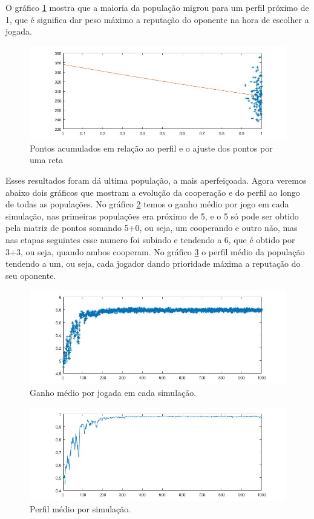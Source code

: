 O gráfico \ref{fig16} mostra que a maioria da população migrou para um perfil próximo de 1, que é significa dar peso máximo a reputação do oponente na hora de escolher a jogada.

\begin{figure}[H]
\centering
\includegraphics[width=14cm]{graf16.jpg}
\caption{Pontos acumulados em relação ao perfil e o ajuste dos pontos por uma reta}
\label{fig16}
\end{figure}

Esses resultados foram dá ultima população, a mais aperfeiçoada. Agora veremos abaixo dois gráficos que mostram a evolução da cooperação e do perfil ao longo de todas as populações. No gráfico \ref{fig17} temos o ganho médio por jogo em cada simulação, nas primeiras populações era próximo de 5, e o 5 só pode ser obtido pela matriz de pontos somando 5+0, ou seja, um cooperando e outro não, mas nas etapas seguintes esse numero foi subindo e tendendo a 6, que é obtido por 3+3, ou seja, quando ambos cooperam. No gráfico \ref{fig18} o perfil médio da população tendendo a um, ou seja, cada jogador dando prioridade máxima a reputação do seu oponente.

\begin{figure}[H]
\centering
\includegraphics[width=14cm]{graf17.jpg}
\caption{Ganho médio por jogada em cada simulação.}
\label{fig17}
\end{figure}

\begin{figure}[H]
\centering
\includegraphics[width=14cm]{graf18.jpg}
\caption{Perfil médio por simulação.}
\label{fig18}
\end{figure}

